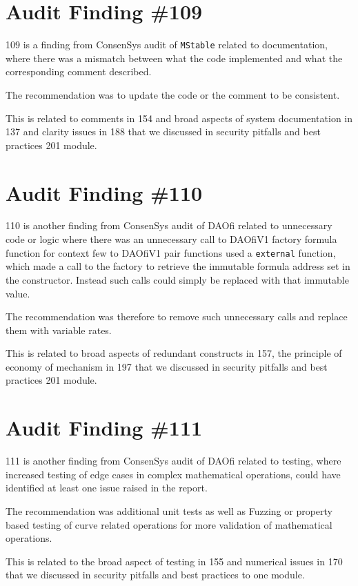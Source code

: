 \section{Audit Finding \#109}

109 is a finding from ConsenSys audit of \verb|MStable| related to documentation, where there was a mismatch between what the code implemented and what the corresponding comment described.

The recommendation was to update the code or the comment to be consistent.

This is related to comments in 154 and broad aspects of system documentation in 137 and clarity issues in 188 that we discussed in security pitfalls and best practices 201 module.

\section{Audit Finding \#110}

110 is another finding from ConsenSys audit of DAOfi related to unnecessary code or logic where there was an unnecessary call to DAOfiV1 factory formula function for context few to DAOfiV1 pair functions used a \verb|external| function, which made a call to the factory to retrieve the immutable formula address set in the constructor. Instead such calls could simply be replaced with that immutable value.

The recommendation was therefore to remove such unnecessary calls and replace them with variable rates.

This is related to broad aspects of redundant constructs in 157, the principle of economy of mechanism in 197 that we discussed in security pitfalls and best practices 201 module.

\section{Audit Finding \#111}

111 is another finding from ConsenSys audit of DAOfi related to testing, where increased testing of edge cases in complex mathematical operations, could have identified at least one issue raised in the report.

The recommendation was additional unit tests as well as Fuzzing or property based testing of curve related operations for more validation of mathematical operations.

This is related to the broad aspect of testing in 155 and numerical issues in 170 that we discussed in security pitfalls and best practices to one module.

